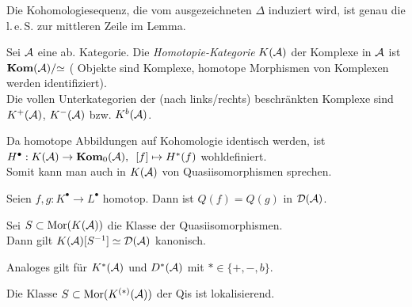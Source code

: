 \documentclass{cheat-sheet}
\newcommand{\CCC}[1]{{#1}^{\bullet}} %
\newcommand{\leS}{l.\,e.\,S.} %
\begin{document}
\begin{beweisidee}
  Die Kohomologiesequenz, die vom ausgezeichneten $\Delta$ induziert wird, ist genau die \leS{} zur mittleren Zeile im Lemma.
\end{beweisidee}



\begin{defn}
  Sei $\mathcal{A}$ eine ab. Kategorie. Die \emph{Homotopie-Kategorie} $K(\mathcal{A})$ der Komplexe in $\mathcal{A}$ ist $\mathbf{Kom}(\mathcal{A})/{\simeq}$ (\dh{} Objekte sind Komplexe, homotope Morphismen von Komplexen werden identifiziert). \\
  Die vollen Unterkategorien der (nach links/rechts) beschränkten Komplexe sind $K^+(\mathcal{A})$, $K^-(\mathcal{A})$ bzw. $K^b(\mathcal{A})$.
\end{defn}

\begin{bem}
  Da homotope Abbildungen auf Kohomologie identisch werden, ist $H^\bullet : K(\mathcal{A}) \to \mathbf{Kom}_0(\mathcal{A}), \enspace [f] \mapsto H^*(f)$ wohldefiniert. \\
  Somit kann man auch in $K(\mathcal{A})$ von Quasiisomorphismen sprechen.
\end{bem}

\begin{lem}
  Seien $f, g : \CCC{K} \to \CCC{L}$ homotop. Dann ist $Q(f) \!=\! Q(g)$ in $\mathcal{D}(\mathcal{A})$.
\end{lem}

\begin{prop}
  Sei $S \subset \operatorname{Mor}(K(\mathcal{A}))$ die Klasse der Quasiisomorphismen. \\
  Dann gilt $K(\mathcal{A})[S^{-1}] \simeq \mathcal{D}(\mathcal{A})$ kanonisch.
\end{prop}

\begin{bem}
  Analoges gilt für $K^*(\mathcal{A})$ und $D^*(\mathcal{A})$ mit $* \in \{ {+}, {-}, b \}$.
\end{bem}

\begin{thm}
  Die Klasse $S \subset \operatorname{Mor}(K^{(*)}(\mathcal{A}))$ der Qis ist lokalisierend.
\end{thm}


\end{document}
